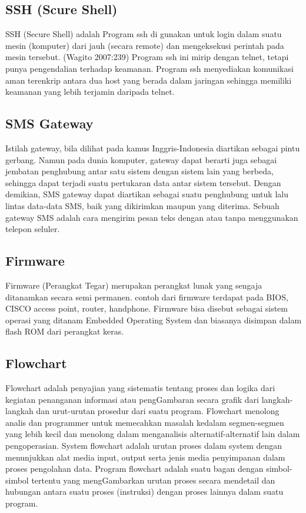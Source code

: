 \documentclass{jtetiproposalskripsi}
\begin{document}
\subsection{SSH (Scure Shell)}
SSH (Secure Shell) adalah Program ssh di gunakan untuk login dalam suatu mesin (komputer) dari jauh (secara remote) dan mengeksekusi perintah pada mesin tersebut. (Wagito 2007:239) Program ssh ini mirip dengan telnet, tetapi punya pengendalian terhadap keamanan. Program ssh menyediakan komunikasi aman terenkrip antara dua host yang berada dalam jaringan sehingga memiliki keamanan yang lebih terjamin daripada telnet.

\subsection{SMS Gateway}
Istilah gateway, bila dilihat pada kamus Inggris-Indonesia diartikan sebagai pintu gerbang. Namun pada dunia komputer, gateway dapat berarti juga sebagai jembatan penghubung antar satu sistem dengan sistem lain yang berbeda, sehingga dapat terjadi suatu pertukaran data antar sistem tersebut. Dengan demikian, SMS gateway dapat diartikan sebagai suatu penghubung untuk lalu lintas data-data SMS, baik yang dikirimkan maupun yang diterima. Sebuah gateway SMS adalah cara mengirim pesan teks dengan atau tanpa menggunakan telepon seluler.

\subsection{Firmware}
Firmware (Perangkat Tegar) merupakan perangkat lunak yang sengaja ditanamkan secara semi permanen. contoh dari firmware terdapat pada BIOS, CISCO access point, router, handphone. Firmware bisa disebut sebagai sistem operasi yang ditanam Embedded Operating System dan biasanya disimpan dalam flash ROM dari perangkat keras.

\subsection{Flowchart}
Flowchart adalah penyajian yang sistematis tentang proses dan logika dari kegiatan penanganan informasi atau pengGambaran secara grafik dari langkah-langkah dan urut-urutan prosedur dari suatu program. Flowchart menolong analis dan programmer untuk memecahkan masalah kedalam segmen-segmen yang lebih kecil dan menolong dalam menganalisis alternatif-alternatif lain dalam pengoperasian. System flowchart adalah urutan proses dalam system dengan menunjukkan alat media input, output serta jenis media penyimpanan dalam proses pengolahan data. Program flowchart adalah suatu bagan dengan simbol-simbol tertentu yang mengGambarkan urutan proses secara mendetail dan hubungan antara suatu proses (instruksi) dengan proses lainnya dalam suatu program.
\end{document}
